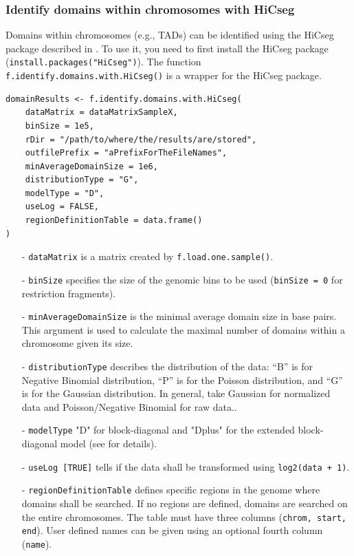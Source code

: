 \documentclass[a4paper,10pt]{article}
\begin{document}
\subsubsection{Identify domains within chromosomes with HiCseg}
Domains within chromosomes (e.g., TADs) can be identified using the HiCseg package described in \cite{2014_LevyLeduc}. To use it, you need to first install the HiCseg package (\texttt{install.packages("HiCseg")}). The function \texttt{f.identify.domains.with.HiCseg()} is a wrapper for the HiCseg package.
\begin{verbatim}
domainResults <- f.identify.domains.with.HiCseg(
    dataMatrix = dataMatrixSampleX,
    binSize = 1e5,
    rDir = "/path/to/where/the/results/are/stored",
    outfilePrefix = "aPrefixForTheFileNames",
    minAverageDomainSize = 1e6,
    distributionType = "G",
    modelType = "D",
    useLog = FALSE,
    regionDefinitionTable = data.frame()
)
\end{verbatim}
\begin{itemize}
 \item[-] \texttt{dataMatrix} is a matrix created by \texttt{f.load.one.sample()}.
 \item[-] \texttt{binSize} specifies the size of the genomic bins to be used (\texttt{binSize = 0} for restriction fragments).
 \item[-] \texttt{minAverageDomainSize} is the minimal average domain size in base pairs. This argument is used to calculate the maximal number of domains within a chromosome given its size.
 \item[-] \texttt{distributionType} describes the distribution of the data: ``B'' is for Negative Binomial distribution, ``P'' is for the Poisson distribution, and ``G'' is for the Gaussian distribution. In general, take Gaussian for normalized data and Poisson/Negative Binomial for raw data..
 \item[-] \texttt{modelType} "D" for block-diagonal and "Dplus" for the extended block-diagonal model (see \cite{2014_LevyLeduc} for details).
 \item[-] \texttt{useLog [TRUE]} tells if the data shall be transformed using \texttt{log2(data + 1)}.
 \item[-] \texttt{regionDefinitionTable} defines specific regions in the genome where domains shall be searched. If no regions are defined, domains are searched on the entire chromosomes. The table must have three columns (\texttt{chrom, start, end}). User defined names can be given using an optional fourth column (\texttt{name}).
\end{itemize}
\clearpage
\end{document}
